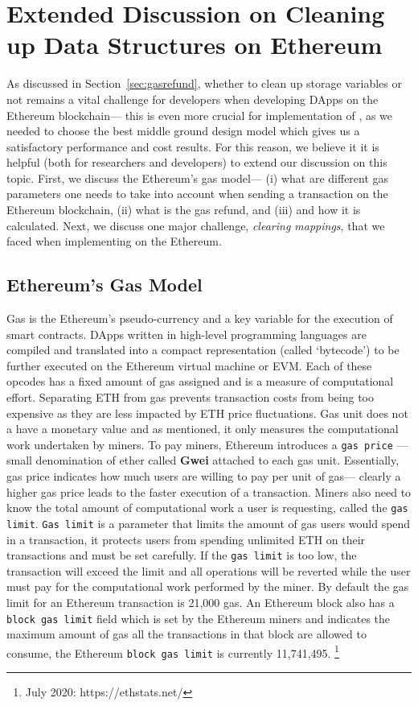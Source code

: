 

\section{Extended Discussion on Cleaning up Data Structures on Ethereum}

As discussed in Section~\ref{sec:gasrefund}, whether to clean up storage variables or not remains a vital challenge for developers when developing DApps on the Ethereum blockchain--- this is even more crucial for implementation of \cm, as we needed  to choose the best middle ground design model which gives us a satisfactory performance and cost results. For this reason, we believe it it is helpful (both for researchers and developers) to extend our discussion on this topic. First, we discuss the Ethereum's gas model--- (i) what are different gas parameters one needs to take into account when sending a transaction on the Ethereum blockchain, (ii) what is the gas refund, and (iii) and how it is calculated.  Next, we discuss one major challenge, \textit{clearing mappings}, that we faced when implementing \cm on the Ethereum.


\subsection{Ethereum's Gas Model} 

Gas is the Ethereum's pseudo-currency and a key variable for the execution of smart contracts. DApps written in high-level programming languages are compiled and translated into a compact representation (called ‘bytecode’) to be further executed on the Ethereum virtual machine or EVM. Each of these opcodes has a fixed amount of gas assigned and is a measure of computational effort. Separating ETH from gas prevents transaction costs from being too expensive as they are less impacted by ETH price fluctuations. Gas unit does not a have a monetary value and as mentioned, it only  measures the computational work undertaken by miners. To pay miners, Ethereum introduces a \texttt{gas price} --- small denomination of ether called \textbf{Gwei} attached to each gas unit. Essentially, gas price indicates how much users are willing to pay per unit of gas--- clearly a higher gas price leads to the faster execution of a transaction. Miners also need to know the total amount of computational work a user is requesting, called the \texttt{gas limit}. \texttt{Gas limit} is a parameter that limits the amount of gas users would spend in a transaction, it protects users from spending unlimited ETH on their transactions and must be set carefully. If the \texttt{gas limit} is too low, the transaction will exceed the limit and all operations will be reverted while the user must pay for the computational work performed by the miner. By default the gas limit for an Ethereum transaction is 21,000 gas. An Ethereum block also has a \texttt{block gas limit} field which is set by the Ethereum miners and indicates the maximum amount of gas all the transactions in that block are allowed to consume, the Ethereum \texttt{block gas limit} is currently 11,741,495. \footnote{July 2020: https://ethstats.net/} 


